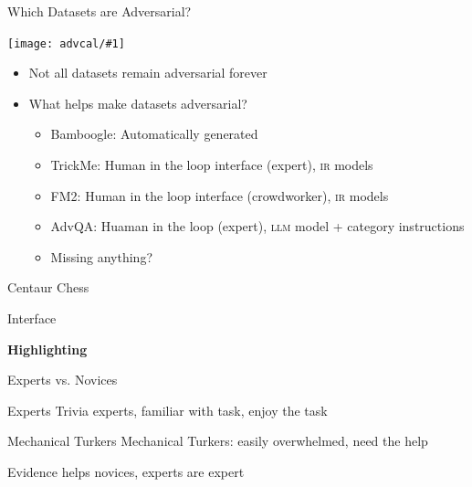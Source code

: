 \documentclass[compress]{beamer}
\newcommand{\abr}[1]{\textsc{#1} }
\newcommand{\fsi}[2]{
\begin{frame}[plain]
\vspace*{-1pt}
\makebox[\linewidth]{\texttt{[image: \#1]}}
\begin{center}
#2
\end{center}
\end{frame}
}
\newcommand{\gfxa}[2]{
	\begin{center}
		\texttt{[image: advcal/\#1]}
	\end{center}
}
\begin{document}
    

    \begin{frame}{Which Datasets are Adversarial?}
      \gfxa{cumulative_advscore}{.9}

      \begin{itemize}
      \item Not all datasets remain adversarial forever
      \item What helps make datasets adversarial?
        \begin{itemize}
          \item Bamboogle: Automatically generated          
          \item TrickMe: Human in the loop interface (expert), \abr{ir} models
        \item FM2: Human in the loop interface (crowdworker), \abr{ir} models
        \item AdvQA: Huaman in the loop (expert), \abr{llm} model + category instructions
        \pause
        \item Missing anything?
        \end{itemize}

      \end{itemize}
    \end{frame}

\fsi{simtrans/centaur-chess}{Centaur Chess}

\fsi{qb/augment/screenshot_all}{Interface}

\fsi{qb/augment/screenshot_guesses}{}

\fsi{qb/augment/screenshot_highlight}{{\bf Highlighting}}

\fsi{qb/augment/screenshot_evidence}{}

\begin{frame}{Experts vs. Novices}

 \begin{block}{Experts}
   Trivia experts, familiar with task, enjoy the task
 \end{block}

 \begin{block}{Mechanical Turkers}
   Mechanical Turkers: easily overwhelmed, need the help
 \end{block}

\end{frame}

\fsi{qb/augment/tools_acc}{Evidence helps novices, experts are expert}
\end{document}
